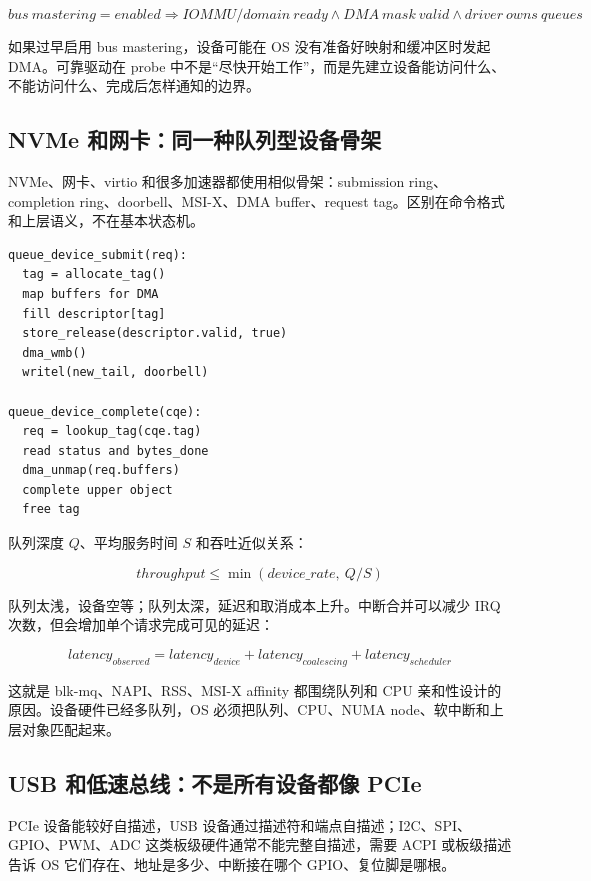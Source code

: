 \[
bus\ mastering=enabled
\Rightarrow
IOMMU/domain\ ready \land DMA\ mask\ valid \land driver\ owns\ queues
\]

如果过早启用 bus mastering，设备可能在 OS 没有准备好映射和缓冲区时发起 DMA。可靠驱动在 probe 中不是“尽快开始工作”，而是先建立设备能访问什么、不能访问什么、完成后怎样通知的边界。

\subsection{NVMe 和网卡：同一种队列型设备骨架}

NVMe、网卡、virtio 和很多加速器都使用相似骨架：submission ring、completion ring、doorbell、MSI-X、DMA buffer、request tag。区别在命令格式和上层语义，不在基本状态机。

\begin{lstlisting}
queue_device_submit(req):
  tag = allocate_tag()
  map buffers for DMA
  fill descriptor[tag]
  store_release(descriptor.valid, true)
  dma_wmb()
  writel(new_tail, doorbell)

queue_device_complete(cqe):
  req = lookup_tag(cqe.tag)
  read status and bytes_done
  dma_unmap(req.buffers)
  complete upper object
  free tag
\end{lstlisting}

队列深度 \(Q\)、平均服务时间 \(S\) 和吞吐近似关系：

\[
throughput \le \min(device\_rate,\ Q/S)
\]

队列太浅，设备空等；队列太深，延迟和取消成本上升。中断合并可以减少 IRQ 次数，但会增加单个请求完成可见的延迟：

\[
latency_{observed}=latency_{device}+latency_{coalescing}+latency_{scheduler}
\]

这就是 blk-mq、NAPI、RSS、MSI-X affinity 都围绕队列和 CPU 亲和性设计的原因。设备硬件已经多队列，OS 必须把队列、CPU、NUMA node、软中断和上层对象匹配起来。

\subsection{USB 和低速总线：不是所有设备都像 PCIe}

PCIe 设备能较好自描述，USB 设备通过描述符和端点自描述；I2C、SPI、GPIO、PWM、ADC 这类板级硬件通常不能完整自描述，需要 ACPI 或板级描述告诉 OS 它们存在、地址是多少、中断接在哪个 GPIO、复位脚是哪根。

